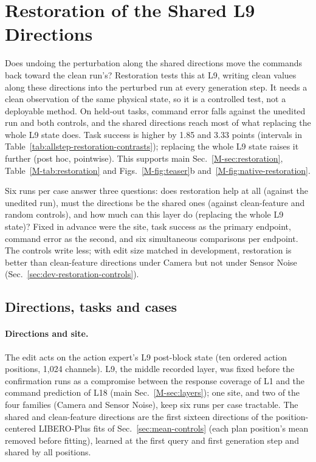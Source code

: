 \section{Restoration of the Shared L9 Directions}
\label{sec:allstep-restoration}

Does undoing the perturbation along the shared directions move the commands back toward the clean run's? Restoration tests this at L9, writing clean values along these directions into the perturbed run at every generation step. It needs a clean observation of the same physical state, so it is a controlled test, not a deployable method. On held-out tasks, command error falls against the unedited run and both controls, and the shared directions reach most of what replacing the whole L9 state does. Task success is higher by 1.85 and 3.33 points (intervals in Table~\ref{tab:allstep-restoration-contrasts}); replacing the whole L9 state raises it further (post hoc, pointwise). This supports main Sec.~\ref*{M-sec:restoration}, Table~\ref*{M-tab:restoration} and Figs.~\ref*{M-fig:teaser}b and~\ref*{M-fig:native-restoration}.

Six runs per case answer three questions: does restoration help at all (against the unedited run), must the directions be the shared ones (against clean-feature and random controls), and how much can this layer do (replacing the whole L9 state)? Fixed in advance were the site, task success as the primary endpoint, command error as the second, and six simultaneous comparisons per endpoint. The controls write less; with edit size matched in development, restoration is better than clean-feature directions under Camera but not under Sensor Noise (Sec.~\ref{sec:dev-restoration-controls}).

\subsection{Directions, tasks and cases}

\paragraph{Directions and site.}
The edit acts on the action expert's L9 post-block state (ten ordered action positions, 1,024 channels). L9, the middle recorded layer, was fixed before the confirmation runs as a compromise between the response coverage of L1 and the command prediction of L18 (main Sec.~\ref*{M-sec:layers}); one site, and two of the four families (Camera and Sensor Noise), keep six runs per case tractable. The shared and clean-feature directions are the first sixteen directions of the position-centered LIBERO-Plus fits of Sec.~\ref{sec:mean-controls} (each plan position's mean removed before fitting), learned at the first query and first generation step and shared by all positions.


